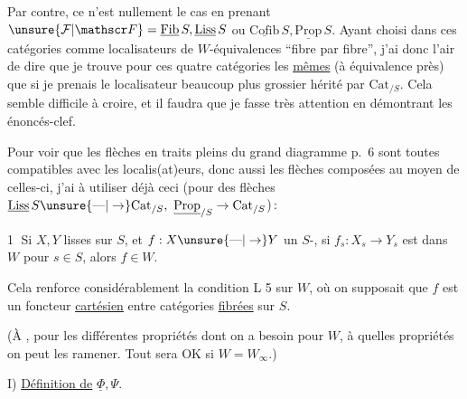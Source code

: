 
Par contre, ce n'est nullement le cas en prenant $\unsure{\mathcal F|\mathscr F}=\underline{\mathrm{Fib}}\,S,\underline{\mathrm{Liss}}\,S$ ou $\underline{\mathrm{Cofib}}\,S,\underline{\mathrm{Prop}}\,S$. Ayant choisi dans ces catégories comme localisateurs  de $W$-équivalences ``fibre par fibre'', j'ai donc l'air de dire que je trouve pour ces quatre catégories les \uline{mêmes}  (à équivalence près) que si je prenais le localisateur beaucoup plus grossier hérité par $\mathrm{Cat}_{/S}$. Cela semble difficile à croire, et il faudra que je fasse très attention en démontrant les énoncés-clef.

Pour voir que les flèches en traits pleins du grand diagramme p.~6 sont toutes compatibles avec les localis(at)eurs, donc aussi les flèches composées au moyen de celles-ci, j'ai à utiliser déjà ceci (pour  des flèches $\underline{\mathrm{Liss}}\,S\unsure{\text{---}|\to}\mathrm{Cat}_{/S},\ \underline{\mathrm{Prop}}_{/S}\to\mathrm{Cat}_{/S}$)\,:

\textcircled{1} Si $X,Y$ lisses  sur $S$, et $f:X\unsure{\text{---}|\to}Y$ un $S$-, si $f_s:X_s\to Y_s$ est dans $W$ pour  $s\in S$, alors $f\in W$.

Cela renforce considérablement la condition L 5 sur $W$, où on supposait  que $f$ est un foncteur \uline{cartésien} entre catégories \uline{fibrées} sur $S$.

(À , pour les différentes propriétés dont on a besoin\unsure{$\ne$|,} pour $W$, à quelles propriétés  on peut les ramener. Tout sera OK si $W=W_\infty$.)


I) \uline{Définition de} $\underline{\Phi},\Psi$.


